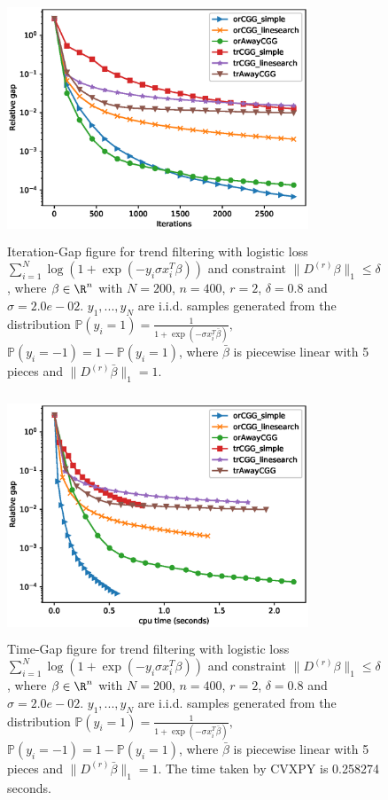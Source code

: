 
\begin{figure}[htbp]
\centering
\includegraphics[height=7.2cm,width=9cm]{Images/Logistic_Iterations_vs_RelativeGap_7.eps}
\caption{Iteration-Gap figure for trend filtering with logistic loss $\sum_{i=1}^N \log \left( 1+\exp(-y_i\sigma x_i^T \beta) \right)$ and constraint $\|D^{(r)} \beta\|_1 \le \delta$, where $\beta\in \R^n$ with $N= 200$, $n = 400$, $r = 2$, $\delta= 0.8$ and $\sigma= 2.0e-02$. $y_1,...,y_N$ are i.i.d. samples generated from the distribution $\mathbb{P}(y_i = 1) = \frac{1}{1+\exp(-\sigma x_i^T \bar \beta)}, $ $\mathbb{P}(y_i = -1) = 1- \mathbb{P}(y_i = 1)$, where $\bar \beta$ is piecewise linear with 5 pieces and $\|D^{(r)} \bar \beta\|_1 = 1$.}
\label{Iteration-Gap7}
\end{figure}


\begin{figure}[htbp]
\centering
\includegraphics[height=7.2cm,width=9cm]{Images/Logistic_Time_vs_RelativeGap_7.eps}
\caption{Time-Gap figure for trend filtering with logistic loss $\sum_{i=1}^N \log \left( 1+\exp(-y_i\sigma x_i^T \beta) \right)$ and constraint $\|D^{(r)} \beta\|_1 \le \delta$, where $\beta\in \R^n$ with $N= 200$, $n = 400$, $r = 2$, $\delta= 0.8$ and $\sigma= 2.0e-02$. $y_1,...,y_N$ are i.i.d. samples generated from the distribution $\mathbb{P}(y_i = 1) = \frac{1}{1+\exp(-\sigma x_i^T \bar \beta)}, $ $\mathbb{P}(y_i = -1) = 1- \mathbb{P}(y_i = 1)$, where $\bar \beta$ is piecewise linear with 5 pieces and $\|D^{(r)} \bar \beta\|_1 = 1$. The time taken by CVXPY is 0.258274 seconds.}
\label{Time-Gap7}
\end{figure}

